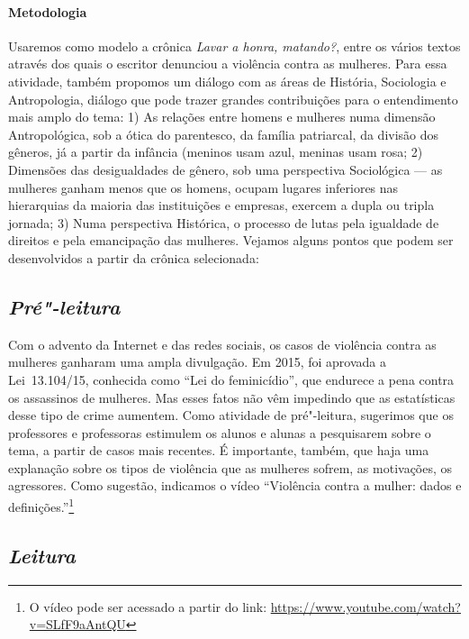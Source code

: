 \documentclass[11pt]{extarticle}
\begin{document}
{{\paragraph{Metodologia} Usaremos como modelo a crônica {\textit{Lavar
a honra, matando?}}, entre os vários textos através dos quais o escritor
denunciou a violência contra as mulheres. Para essa atividade, também
propomos um diálogo com as áreas de História, Sociologia e Antropologia,
diálogo que pode trazer grandes contribuições para o entendimento mais
amplo do tema: 1) As relações entre homens e mulheres numa dimensão
Antropológica, sob a ótica do parentesco, da família patriarcal, da
divisão dos gêneros, já a partir da infância (meninos usam azul, meninas
usam rosa; 2) Dimensões das desigualdades de gênero, sob uma perspectiva
Sociológica --- as mulheres ganham menos que os homens, ocupam lugares
inferiores nas hierarquias da maioria das instituições e empresas,
exercem a dupla ou tripla jornada; 3) Numa perspectiva Histórica, o
processo de lutas pela igualdade de direitos e pela emancipação das
mulheres. Vejamos alguns pontos que podem ser desenvolvidos a partir da
crônica selecionada:

\subsection{\textit{Pré"-leitura}}

Com o advento da Internet e das redes sociais, os casos de violência
contra as mulheres ganharam uma ampla divulgação. Em 2015, foi aprovada
a Lei~13.104/15, conhecida como ``Lei do feminicídio'', que endurece a
pena contra os assassinos de mulheres. Mas esses fatos não vêm impedindo
que as estatísticas desse tipo de crime aumentem. Como atividade de
pré"-leitura, sugerimos que os professores e professoras estimulem os
alunos e alunas a pesquisarem sobre o tema, a partir de casos mais recentes.
É importante, também, que haja uma explanação sobre os tipos de violência
que as mulheres sofrem, as motivações, os agressores. Como sugestão,
indicamos o vídeo ``Violência contra a mulher: dados e
definições.''\footnote{O vídeo pode ser acessado a partir do link:
  \url{https://www.youtube.com/watch?v=SLfF9aAntQU}}


\subsection{\textit{Leitura}}
	
}}
\end{document}
